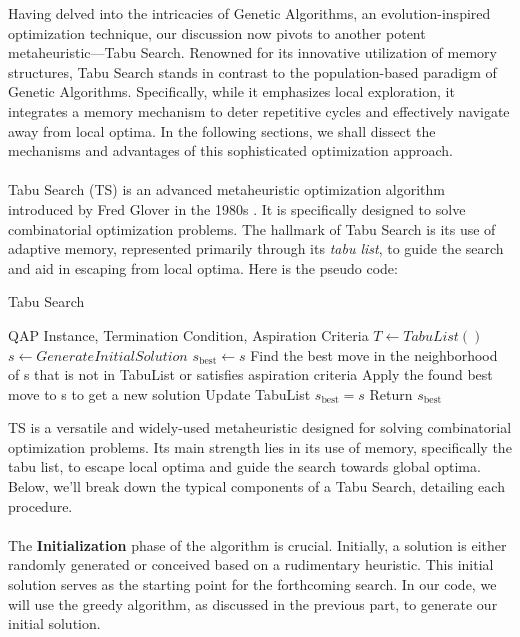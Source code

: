 \documentclass[a4paper,10pt]{article}
\begin{document}
Having delved into the intricacies of Genetic Algorithms, an evolution-inspired optimization technique, our discussion now pivots to another potent metaheuristic—Tabu Search. Renowned for its innovative utilization of memory structures, Tabu Search stands in contrast to the population-based paradigm of Genetic Algorithms. Specifically, while it emphasizes local exploration, it integrates a memory mechanism to deter repetitive cycles and effectively navigate away from local optima. In the following sections, we shall dissect the mechanisms and advantages of this sophisticated optimization approach.\\
\\
Tabu Search (TS) is an advanced metaheuristic optimization algorithm introduced by Fred Glover in the 1980s \cite{GLOVER1986533}. It is specifically designed to solve combinatorial optimization problems. The hallmark of Tabu Search is its use of adaptive memory, represented primarily through its \textit{tabu list}, to guide the search and aid in escaping from local optima. Here is the pseudo code: 
\begin{algorithm}
\caption{Tabu Search}\label{alg:cap}
\begin{algorithmic}
\Require QAP Instance, Termination Condition, Aspiration Criteria
\State $T \gets TabuList()$
\State $s \gets GenerateInitialSolution$
\State $s_{\text{best}} \gets s$  %
    \State Find the best move in the neighborhood of s that is not in TabuList or satisfies aspiration criteria
    \State Apply the found best move to s to get a new solution
    \State Update TabuList
        \State $s_{\text{best}} = s$
    \EndIf
\EndWhile
\State Return $s_{\text{best}}$
\end{algorithmic}
\end{algorithm}

TS is a versatile and widely-used metaheuristic designed for solving combinatorial optimization problems. Its main strength lies in its use of memory, specifically the tabu list, to escape local optima and guide the search towards global optima. Below, we'll break down the typical components of a Tabu Search, detailing each procedure.\\
\\
The \textbf{Initialization} phase of the algorithm is crucial. Initially, a solution is either randomly generated or conceived based on a rudimentary heuristic. This initial solution serves as the starting point for the forthcoming search. In our code, we will use the greedy algorithm, as discussed in the previous part, to generate our initial solution.
\end{document}
